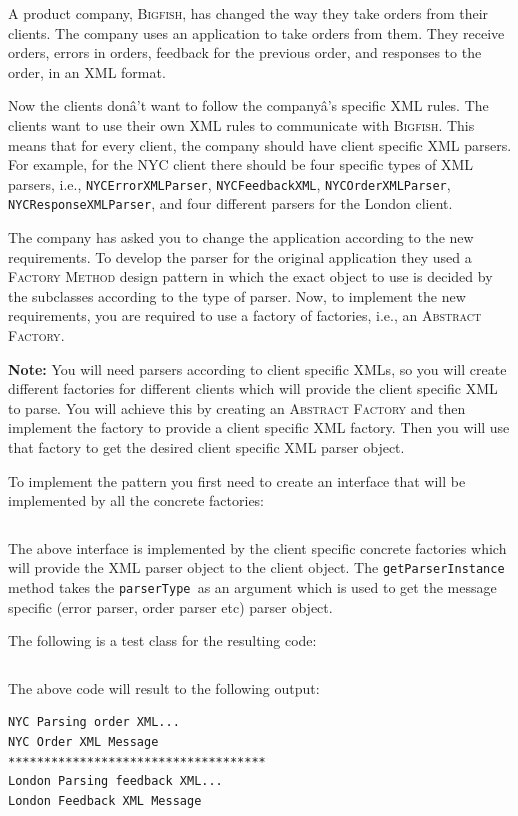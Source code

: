 \documentclass[12pt,a4paper]{exam}
\newcommand{\code}{/Users/keith/Documents/Courses/sdp/repo/worksheets/dp-two/kotlin/src}
\begin{document}
\begin{questions}
\question %
A product company, \textsc{Bigfish}, has changed the way they take orders from their clients. 
The company uses an application to take orders from them. 
They receive orders, errors in orders, feedback for the previous order, 
and responses to the order, in an XML format. 

Now the clients donâ't want to follow the companyâ's specific XML rules. 
The clients want to use their own XML rules to communicate with \textsc{Bigfish}. 
This means that for every client, the company should have client specific XML parsers. 
For example, for the NYC client there should be four specific types of XML parsers, i.e.,
\verb!NYCErrorXMLParser!, \verb!NYCFeedbackXML!, \verb!NYCOrderXMLParser!, 
\verb!NYCResponseXMLParser!, and four different parsers for the London client.

The company has asked you to change the application according to the new requirements. 
To develop the parser for the original application they used a \textsc{Factory 
Method} design pattern in which the exact object to use is decided by the subclasses 
according to the type of parser. Now, to implement the new requirements, 
you are required to use a factory of factories, i.e., an \textsc{Abstract Factory}.

\textbf{Note:} You will need parsers according to client specific XMLs, so you will create 
different factories for different clients which will provide the client specific XML to parse. 
You will achieve this by creating an \textsc{Abstract Factory} and then implement the 
factory to provide a client specific XML factory. 
Then you will use that factory to get the desired client specific XML parser object.

To implement the pattern you first need to create an interface that will be 
implemented by all the concrete factories:

\inputminted{scala}{\code/abstractfactory/AbstractParserFactory.kt}

The above interface is implemented by the client specific concrete factories which will 
provide the XML parser object to the client object. The \verb!getParserInstance! method 
takes the \verb!parserType !as an argument which is used to get the message specific 
(error parser, order parser etc) parser object.

The following is a test class for the resulting code:
\inputminted{scala}{\code/abstractfactory/TestAbstractFactoryPattern.kt}
The above code will result to the following output:
\begin{Verbatim}
NYC Parsing order XML...
NYC Order XML Message
************************************
London Parsing feedback XML...
London Feedback XML Message
\end{Verbatim}


\end{questions}
\end{document}
